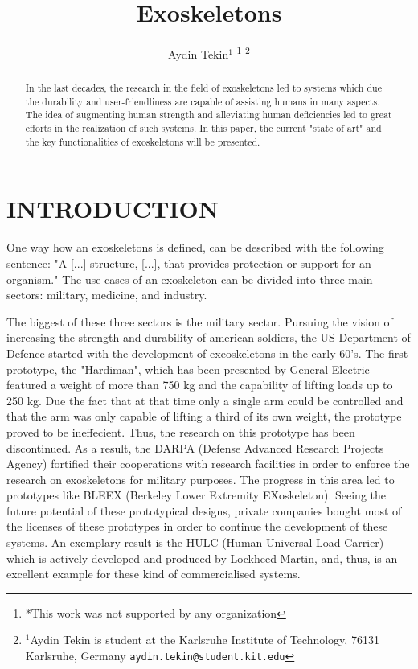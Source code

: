 \documentclass[letterpaper, 10 pt, conference]{ieeeconf}  %
\title{\LARGE \bf
Exoskeletons
}
\author{Aydin Tekin$^{1}$%
\thanks{*This work was not supported by any organization}%
\thanks{$^{1}$Aydin Tekin is student at the Karlsruhe Institute of Technology, 76131 Karlsruhe, Germany
        {\tt\small aydin.tekin@student.kit.edu}}%
}
\begin{document}
\maketitle
\thispagestyle{empty}
\pagestyle{empty}


\begin{abstract}

In the last decades, the research in the field of exoskeletons led to systems which due the durability and
user-friendliness are capable of assisting humans in many aspects. The idea of augmenting human strength and
alleviating human deficiencies led to great efforts in the realization of such systems. In this paper, the current
"state of art" and the key functionalities of exoskeletons will be presented.

\end{abstract}



\section{INTRODUCTION}

One way how an exoskeletons is defined, can be described with the following sentence:
"A [...] structure, [...], that provides protection or support for an organism."
The use-cases of an exoskeleton can be divided into three main sectors: military, medicine, and industry.


The biggest of these three sectors is the military sector.
Pursuing the vision of increasing the strength and durability of american soldiers, the US Department of Defence
started with the development of exeoskeletons in the early 60's. The first prototype, the "Hardiman", which has been presented by
General Electric featured a weight of more than 750 kg and the capability of lifting loads up to 250 kg.
Due the fact that at that time only a single arm could be controlled and that the arm was only capable of lifting
a third of its own weight, the prototype proved to be ineffecient. Thus, the research on this prototype has been
discontinued. As a result, the DARPA (Defense Advanced Research Projects Agency) fortified their cooperations with
research facilities in order to enforce the research on exoskeletons for military purposes. The progress in this area
led to prototypes like BLEEX (Berkeley Lower Extremity EXoskeleton). Seeing the future potential of these prototypical
designs, private companies bought most of the licenses of these prototypes in order to continue the development
of these systems. An exemplary result is the HULC (Human Universal Load Carrier) which is actively developed and produced
by Lockheed Martin, and, thus, is an excellent example for these kind of commercialised systems.
\end{document}
